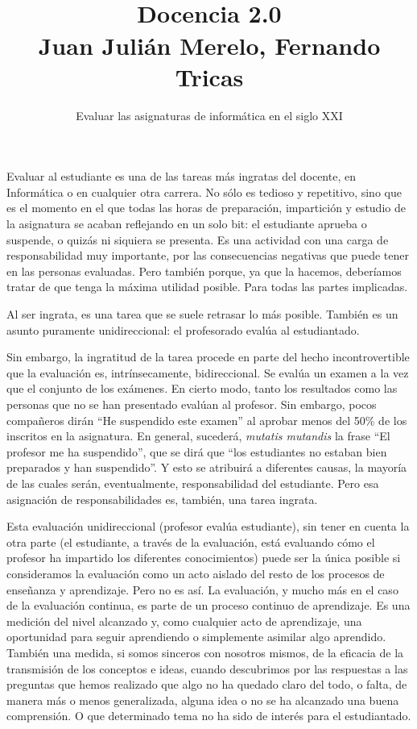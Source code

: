 \documentclass[twoside,10pt]{article}
\title{\ \\ Docencia 2.0\\ \large Juan Julián Merelo, Fernando Tricas}
\author{\LARGE Evaluar las asignaturas de informática en el siglo XXI}
\date{}
\begin{document}
\addtocounter{page}{2}

\maketitle
\vspace*{-5ex}

\begin{multicols}{2}



Evaluar al estudiante es una de las tareas más ingratas del docente,
en Informática o en cualquier otra carrera. No sólo es tedioso y
repetitivo, sino que es el momento en el que todas las horas de
preparación, impartición y estudio de la asignatura se acaban reflejando en un
solo bit: el estudiante aprueba o suspende, o quizás ni siquiera se
presenta.
Es  una actividad con una carga de responsabilidad muy importante, por las
consecuencias negativas que puede tener en las personas evaluadas. Pero
también porque, ya que la hacemos, deberíamos tratar de que tenga la máxima
utilidad posible. Para todas las partes implicadas. 

Al ser ingrata, es una tarea que se suele retrasar lo más
posible. También es un asunto puramente unidireccional: el profesorado
evalúa al estudiantado.

Sin embargo, la ingratitud de la tarea procede en parte del hecho
incontrovertible que la evaluación es, intrínsecamente,
bidireccional. Se evalúa un examen a la vez que el conjunto de los
exámenes. En cierto modo, tanto los resultados como las personas que no se
han presentado evalúan al profesor. Sin embargo, pocos compañeros dirán
``He suspendido este
examen'' al aprobar menos del 50\% de los inscritos en la
asignatura. En general, sucederá, {\em mutatis mutandis} la frase ``El
profesor me ha suspendido'', que se dirá que ``los estudiantes no
estaban bien preparados y han suspendido''. Y esto se atribuirá a
diferentes causas, la mayoría de las cuales serán, eventualmente,
responsabilidad del estudiante. Pero esa asignación de
responsabilidades es, también, una tarea ingrata. 

Esta evaluación unidireccional (profesor evalúa estudiante), sin tener
en cuenta la otra parte (el estudiante, a través de la evaluación,
está evaluando cómo el profesor ha impartido los diferentes
conocimientos) puede ser la única posible si consideramos la
evaluación como un acto aislado del resto de los procesos de enseñanza
y aprendizaje. Pero no es así. 
La evaluación, y
mucho más en el caso de la evaluación continua, es parte de un proceso
continuo de aprendizaje.
 Es una medición del nivel alcanzado y, como
cualquier acto de aprendizaje, una oportunidad para seguir aprendiendo
o simplemente asimilar algo aprendido. 
También una medida, si somos
sinceros con nosotros mismos, de la eficacia de la transmisión de los
conceptos e ideas, cuando descubrimos por las respuestas a las 
preguntas que hemos realizado que algo no ha quedado claro del todo, o
falta, de manera más o menos generalizada, alguna idea o no se ha
alcanzado una buena comprensión. O que determinado tema no ha sido de interés
para el estudiantado. 


\end{multicols}
\end{document}

